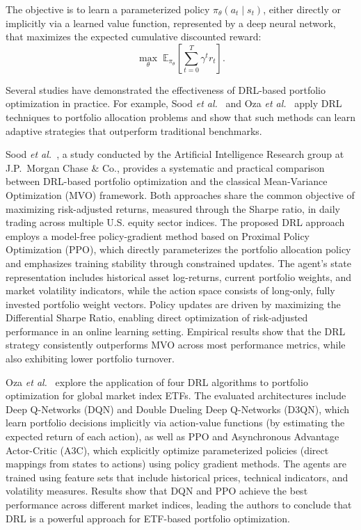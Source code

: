 The objective is to learn a parameterized policy $\pi_\theta(a_t \mid s_t)$, either directly or implicitly via a learned value function, represented by a deep neural network, that maximizes the expected cumulative discounted reward:
\[
\max_{\theta} \; \mathbb{E}_{\pi_\theta} \left[ \sum_{t=0}^{T} \gamma^{t} r_t \right].
\]

Several studies have demonstrated the effectiveness of DRL-based portfolio optimization in practice. For example, Sood \emph{et al.}~\cite{0df79} and Oza \emph{et al.}~\cite{70996} apply DRL techniques to portfolio allocation problems and show that such methods can learn adaptive strategies that outperform traditional benchmarks.

Sood \emph{et al.}~\cite{0df79}, a study conducted by the Artificial Intelligence Research group at J.P.~Morgan Chase \& Co., provides a systematic and practical comparison between DRL-based portfolio optimization and the classical Mean-Variance Optimization (MVO) framework. Both approaches share the common objective of maximizing risk-adjusted returns, measured through the Sharpe ratio, in daily trading across multiple U.S. equity sector indices. The proposed DRL approach employs a model-free policy-gradient method based on Proximal Policy Optimization (PPO), which directly parameterizes the portfolio allocation policy and emphasizes training stability through constrained updates. The agent's state representation includes historical asset log-returns, current portfolio weights, and market volatility indicators, while the action space consists of long-only, fully invested portfolio weight vectors. Policy updates are driven by maximizing the Differential Sharpe Ratio, enabling direct optimization of risk-adjusted performance in an online learning setting. Empirical results show that the DRL strategy consistently outperforms MVO across most performance metrics, while also exhibiting lower portfolio turnover.

Oza \emph{et al.}~\cite{70996} explore the application of four DRL algorithms to portfolio optimization for global market index ETFs. The evaluated architectures include Deep Q-Networks (DQN) and Double Dueling Deep Q-Networks (D3QN), which learn portfolio decisions implicitly via action-value functions (by estimating the expected return of each action), as well as PPO and Asynchronous Advantage Actor-Critic (A3C), which explicitly optimize parameterized policies (direct mappings from states to actions) using policy gradient methods. The agents are trained using feature sets that include historical prices, technical indicators, and volatility measures. Results show that DQN and PPO achieve the best performance across different market indices, leading the authors to conclude that DRL is a powerful approach for ETF-based portfolio optimization.

